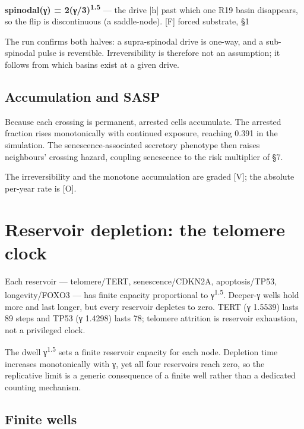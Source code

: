 \documentclass[11pt]{article}
\begin{document}
\begin{vpbox}\textbf{spinodal(γ) = 2(γ/3)\textsuperscript{1.5}} — the drive |h| past which one R19 basin disappears, so the flip is discontinuous (a saddle-node). [F] forced substrate, §1\end{vpbox}

The run confirms both halves: a supra-spinodal drive is one-way, and a sub-spinodal pulse is reversible. Irreversibility is therefore not an assumption; it follows from which basins exist at a given drive.

\subsection*{Accumulation and SASP}

Because each crossing is permanent, arrested cells accumulate. The arrested fraction rises monotonically with continued exposure, reaching 0.391 in the simulation. The senescence-associated secretory phenotype then raises neighbours' crossing hazard, coupling senescence to the risk multiplier of §7.

The irreversibility and the monotone accumulation are graded [V]; the absolute per-year rate is [O].

\section{Reservoir depletion: the telomere clock}

\begin{answerbox}Each reservoir — telomere/TERT, senescence/CDKN2A, apoptosis/TP53, longevity/FOXO3 — has finite capacity proportional to γ\textsuperscript{1.5}. Deeper-γ wells hold more and last longer, but every reservoir depletes to zero. TERT (γ 1.5539) lasts 89 steps and TP53 (γ 1.4298) lasts 78; telomere attrition is reservoir exhaustion, not a privileged clock.\end{answerbox}

\begin{abstractbox}The dwell γ\textsuperscript{1.5} sets a finite reservoir capacity for each node. Depletion time increases monotonically with γ, yet all four reservoirs reach zero, so the replicative limit is a generic consequence of a finite well rather than a dedicated counting mechanism.\end{abstractbox}

\subsection*{Finite wells}
\end{document}
